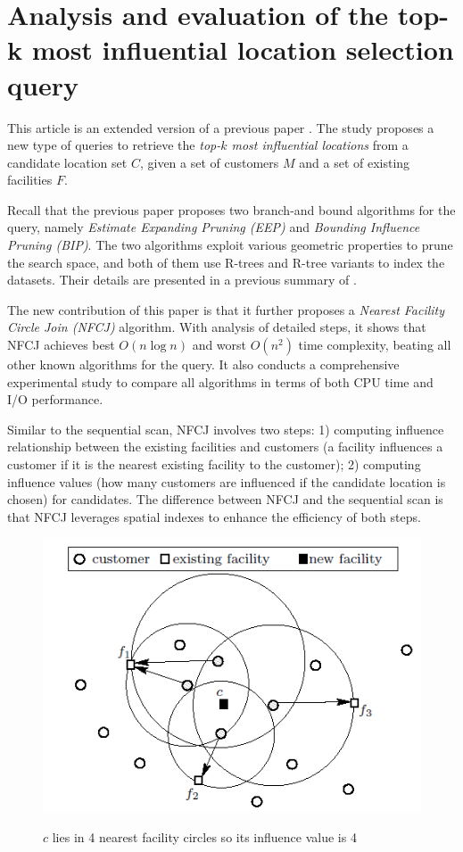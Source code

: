 \documentclass[paper=a4, fontsize=18pt]{article} %
\numberwithin{equation}{section} %
\numberwithin{figure}{section} %
\numberwithin{table}{section} %
\begin{document}
\section{Analysis and evaluation of the top-k most influential location selection query \cite{CHWHTZ15}}

This article is an extended version of a previous paper \cite{HWQZCH11}. The study proposes a new type of queries to retrieve the \emph{top-$k$ most influential locations} from a candidate location set $C$, given a set of customers $M$ and a set of existing facilities $F$.

Recall that the previous paper proposes two branch-and bound algorithms for the query, namely \emph{Estimate Expanding Pruning (EEP)} and \emph{Bounding Influence Pruning (BIP)}.  The two algorithms exploit various geometric properties to prune the search space, and both of them use R-trees and R-tree variants to index the datasets. Their details are presented in a previous summary of \cite{HWQZCH11}.

The new contribution of this paper is that it further proposes a \emph{Nearest Facility Circle Join (NFCJ)} algorithm. With analysis of detailed steps, it shows that NFCJ achieves best $O(n \log n)$ and worst $O(n^2)$ time complexity, beating all other known algorithms for the query. It also conducts a comprehensive experimental study to compare all algorithms in terms of both CPU time and I/O performance.

Similar to the sequential scan, NFCJ involves two steps: 1) computing influence relationship between the existing facilities and customers (a facility influences a customer if it is the nearest existing facility to the customer); 2) computing influence values (how many customers are influenced if the candidate location is chosen) for candidates. The difference between NFCJ and the sequential scan is that NFCJ leverages spatial indexes to enhance the efficiency of both steps.

\begin{figure}[h]
  \centering
  \includegraphics[width=.5\linewidth]{9_5_TopK.png}\\
  \caption{$c$ lies in 4 nearest facility circles so its influence value is 4}\label{fig:TopK}
\end{figure}
\end{document}
